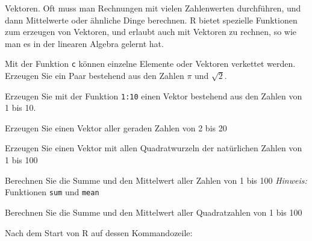 Vektoren. Oft muss man Rechnungen mit vielen Zahlenwerten durchführen,
und dann Mittelwerte oder ähnliche Dinge berechnen. R bietet spezielle
Funktionen zum erzeugen von Vektoren, und erlaubt auch mit Vektoren
zu rechnen, so wie man es in der linearen Algebra gelernt hat.
\begin{teilaufgaben}
\item Mit der Funktion {\tt c} können einzelne Elemente oder
Vektoren verkettet werden. Erzeugen Sie ein Paar bestehend aus
den Zahlen $\pi$ und $\sqrt{2}$.
\item Erzeugen Sie mit der Funktion {\tt 1:10} einen Vektor bestehend
aus den Zahlen von 1 bis 10.
\item Erzeugen Sie einen Vektor aller geraden Zahlen von 2 bis 20
\item Erzeugen Sie einen Vektor mit allen Quadratwurzeln der natürlichen
Zahlen von 1 bis 100
\item Berechnen Sie die Summe und den Mittelwert aller Zahlen von 1 bis 100
\quad
{\it Hinweis\/:} Funktionen {\tt sum} und {\tt mean}
\item Berechnen Sie die Summe und den Mittelwert aller Quadratzahlen von 1 bis 100
\end{teilaufgaben}


\begin{loesung}
Nach dem Start von R auf dessen Kommandozeile:
\end{loesung}

